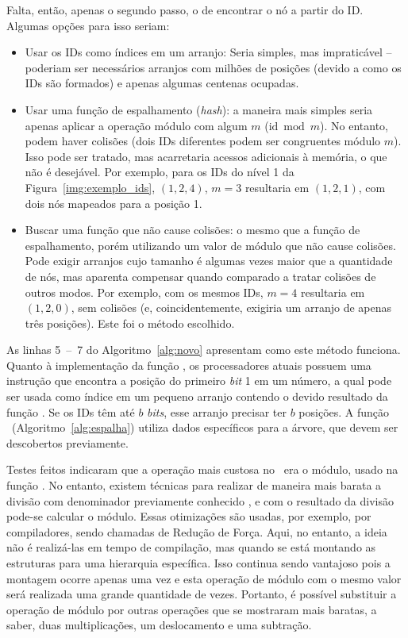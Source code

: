 


Falta, então, apenas o segundo passo, o de encontrar o nó a partir do ID.
Algumas opções para isso seriam:
\begin{itemize}
	\item Usar os IDs como índices em um arranjo: Seria simples, mas impraticável -- poderiam ser necessários arranjos com milhões de posições (devido a como os IDs são formados) e apenas algumas centenas ocupadas.
	\item Usar uma função de espalhamento (\textit{hash}): a maneira mais simples seria apenas aplicar a operação módulo com algum $m$ ($\mathrm{id} \bmod m$).
	No entanto, podem haver colisões (dois IDs diferentes podem ser congruentes módulo $m$).
	Isso pode ser tratado, mas acarretaria acessos adicionais à memória, o que não é desejável.
	Por exemplo, para os IDs do nível 1 da Figura~\ref{img:exemplo_ids}, $(1, 2, 4)$, $m = 3$ resultaria em $(1, 2, 1)$, com dois nós mapeados para a posição 1.
	\item Buscar uma função que não cause colisões: o mesmo que a função de espalhamento, porém utilizando um valor de módulo que não cause colisões.
	Pode exigir arranjos cujo tamanho é algumas vezes maior que a quantidade de nós, mas aparenta compensar quando comparado a tratar colisões de outros modos.
	Por exemplo, com os mesmos IDs, $m = 4$ resultaria em $(1, 2, 0)$, sem colisões (e, coincidentemente, exigiria um arranjo de apenas três posições).
	Este foi o método escolhido.
\end{itemize}

As linhas 5~--~7 do Algoritmo~\ref{alg:novo} apresentam como este método funciona.
Quanto à implementação da função \bpn, os processadores atuais possuem uma instrução que encontra a posição do primeiro \textit{bit} 1 em um número, a qual pode ser usada como índice em um pequeno arranjo contendo o devido resultado da função \bpn.
Se os IDs têm até $b$ \textit{bits}, esse arranjo precisar ter $b$ posições.
A função \Espalha\ (Algoritmo~\ref{alg:espalha}) utiliza dados específicos para a árvore, que devem ser descobertos previamente.

Testes feitos indicaram que a operação mais custosa no \Novo\ era o módulo, usado na função \Espalha.
No entanto, existem técnicas para realizar de maneira mais barata a divisão com denominador previamente conhecido \cite{reciproco}, e com o resultado da divisão pode-se calcular o módulo.
Essas otimizações são usadas, por exemplo, por compiladores, sendo chamadas de Redução de Força.
Aqui, no entanto, a ideia não é realizá-las em tempo de compilação, mas quando se está montando as estruturas para uma hierarquia específica.
Isso continua sendo vantajoso pois a montagem ocorre apenas uma vez e esta operação de módulo com o mesmo valor será realizada uma grande quantidade de vezes.
Portanto, é possível substituir a operação de módulo por outras operações que se mostraram mais baratas, a saber, duas multiplicações, um deslocamento e uma subtração.

